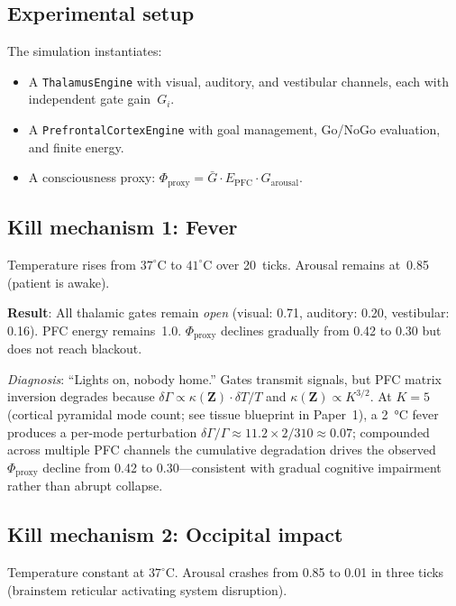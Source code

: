 \documentclass[aps,pre,twocolumn,superscriptaddress,floatfix]{revtex4-2}
\begin{document}
\subsection{Experimental setup}

The simulation instantiates:
\begin{itemize}
  \item A \texttt{ThalamusEngine} with visual, auditory, and
    vestibular channels, each with independent gate gain~$G_i$.
  \item A \texttt{PrefrontalCortexEngine} with goal management,
    Go/NoGo evaluation, and finite energy.
  \item A consciousness proxy:
    $\Phi_{\text{proxy}}=\bar{G}\cdot E_{\text{PFC}}\cdot
    G_{\text{arousal}}$.
\end{itemize}

\subsection{Kill mechanism 1: Fever}

Temperature rises from $37^\circ$C to $41^\circ$C
over 20~ticks.  Arousal remains at~0.85 (patient is awake).

\textbf{Result}: All thalamic gates remain \emph{open}
(visual: 0.71, auditory: 0.20, vestibular: 0.16).
PFC energy remains~1.0.
$\Phi_{\text{proxy}}$ declines gradually from 0.42 to 0.30
but does not reach blackout.

\emph{Diagnosis}: ``Lights on, nobody home.''
Gates transmit signals, but PFC matrix inversion degrades
because $\delta\Gamma\propto\kappa(\mathbf{Z})\cdot\delta T/T$
and $\kappa(\mathbf{Z})\propto K^{3/2}$.
At $K=5$ (cortical pyramidal mode count;
see tissue blueprint in Paper~1),
a \SI{2}{\celsius} fever produces a per-mode perturbation
$\delta\Gamma/\Gamma\approx 11.2\times 2/310\approx 0.07$;
compounded across multiple PFC channels the cumulative
degradation drives the observed $\Phi_{\text{proxy}}$
decline from 0.42 to 0.30---consistent with gradual
cognitive impairment rather than abrupt collapse.

\subsection{Kill mechanism 2: Occipital impact}

Temperature constant at $37^\circ$C.
Arousal crashes from 0.85 to 0.01 in three ticks (brainstem
reticular activating system disruption).
\end{document}
